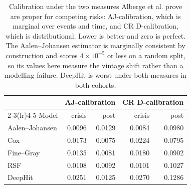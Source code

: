 \begin{table}[t]
\caption{Calibration under the two measures Alberge et al. prove are proper for competing risks: AJ-calibration, which is marginal over events and time, and CR D-calibration, which is distributional. Lower is better and zero is perfect. The Aalen--Johansen estimator is marginally consistent by construction and scores $4\times10^{-5}$ or less on a random split, so its values here measure the vintage shift rather than a modelling failure. DeepHit is worst under both measures in both cohorts.}
\label{tab:calib}
\centering\footnotesize
\setlength{\tabcolsep}{5pt}
\begin{tabular}{@{}lrrrr@{}}
\toprule
& \multicolumn{2}{c}{AJ-calibration} & \multicolumn{2}{c}{CR D-calibration} \\
\cmidrule(lr){2-3}\cmidrule(lr){4-5}
Model & crisis & post & crisis & post \\
\midrule
Aalen--Johansen & 0.0096 & 0.0129 & 0.0084 & 0.0980 \\
Cox & 0.0173 & 0.0075 & 0.0224 & 0.0795 \\
Fine--Gray & 0.0135 & 0.0081 & 0.0180 & 0.0902 \\
RSF & 0.0108 & 0.0092 & 0.0101 & 0.1027 \\
DeepHit & 0.0251 & 0.0125 & 0.0270 & 0.1286 \\
\bottomrule
\end{tabular}
\end{table}
